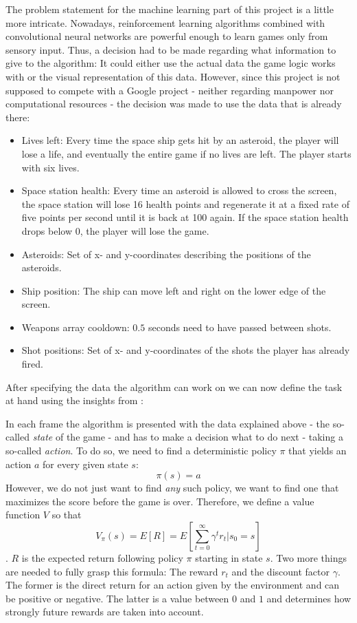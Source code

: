 \documentclass[a4paper,10pt]{article}
\begin{document}
The problem statement for the machine learning part of this project is a little more intricate.
Nowadays, reinforcement learning algorithms combined with convolutional neural networks are powerful enough to learn games only from sensory input\cite{DeepmindBreakout}.
Thus, a decision had to be made regarding what information to give to the algorithm:
It could either use the actual data the game logic works with or the visual representation of this data.
However, since this project is not supposed to compete with a Google project - neither regarding manpower nor computational resources - the decision was made to use the data that is already there:

\begin{itemize}
 \item Lives left: Every time the space ship gets hit by an asteroid, the player will lose a life, and eventually the entire game if no lives are left. The player starts with six lives.
 \item Space station health: Every time an asteroid is allowed to cross the screen, the space station will lose 16 health points and regenerate it at a fixed rate of five points per second until it is back at 100 again. If the space station health drops below $0$, the player will lose the game.
 \item Asteroids: Set of x- and y-coordinates describing the positions of the asteroids.
 \item Ship position: The ship can move left and right on the lower edge of the screen.
 \item Weapons array cooldown: $0.5$ seconds need to have passed between shots.
 \item Shot positions: Set of x- and y-coordinates of the shots the player has already fired.
\end{itemize}

After specifying the data the algorithm can work on we can now define the task at hand using the insights from \cite{712192}:

In each frame the algorithm is presented with the data explained above - the so-called \emph{state} of the game - and has to make a decision what to do next - taking a so-called \emph{action}.
To do so, we need to find a deterministic policy $\pi$ that yields an action $a$ for every given state $s$:
\[\pi(s)=a\]
However, we do not just want to find \emph{any} such policy, we want to find one that maximizes the score before the game is over. 
Therefore, we define a value function $V$ so that
\[V_\pi(s) = E[R] = E[\sum_{t=0}^\infty\gamma^tr_t|s_0=s]\].
$R$ is the expected return following policy $\pi$ starting in state $s$.
Two more things are needed to fully grasp this formula: The reward $r_t$ and the discount factor $\gamma$.
The former is the direct return for an action given by the environment and can be positive or negative.
The latter is a value between $0$ and $1$ and determines how strongly future rewards are taken into account.
\end{document}
